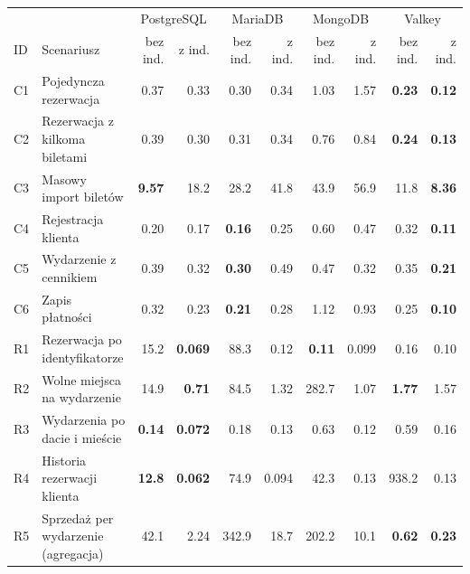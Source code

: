 \begin{tabular}{llrrrrrrrr}
\toprule
 & & \multicolumn{2}{c}{PostgreSQL} & \multicolumn{2}{c}{MariaDB} & \multicolumn{2}{c}{MongoDB} & \multicolumn{2}{c}{Valkey} \\
\cmidrule(lr){3-4}\cmidrule(lr){5-6}\cmidrule(lr){7-8}\cmidrule(lr){9-10}
ID & Scenariusz & bez ind. & z ind. & bez ind. & z ind. & bez ind. & z ind. & bez ind. & z ind. \\
\midrule
C1 & Pojedyncza rezerwacja & \num{0.37} & \num{0.33} & \num{0.30} & \num{0.34} & \num{1.03} & \num{1.57} & \textbf{\num{0.23}} & \textbf{\num{0.12}} \\
C2 & Rezerwacja z kilkoma biletami & \num{0.39} & \num{0.30} & \num{0.31} & \num{0.34} & \num{0.76} & \num{0.84} & \textbf{\num{0.24}} & \textbf{\num{0.13}} \\
C3 & Masowy import biletów & \textbf{\num{9.57}} & \num{18.2} & \num{28.2} & \num{41.8} & \num{43.9} & \num{56.9} & \num{11.8} & \textbf{\num{8.36}} \\
C4 & Rejestracja klienta & \num{0.20} & \num{0.17} & \textbf{\num{0.16}} & \num{0.25} & \num{0.60} & \num{0.47} & \num{0.32} & \textbf{\num{0.11}} \\
C5 & Wydarzenie z cennikiem & \num{0.39} & \num{0.32} & \textbf{\num{0.30}} & \num{0.49} & \num{0.47} & \num{0.32} & \num{0.35} & \textbf{\num{0.21}} \\
C6 & Zapis płatności & \num{0.32} & \num{0.23} & \textbf{\num{0.21}} & \num{0.28} & \num{1.12} & \num{0.93} & \num{0.25} & \textbf{\num{0.10}} \\
\midrule
R1 & Rezerwacja po identyfikatorze & \num{15.2} & \textbf{\num{0.069}} & \num{88.3} & \num{0.12} & \textbf{\num{0.11}} & \num{0.099} & \num{0.16} & \num{0.10} \\
R2 & Wolne miejsca na wydarzenie & \num{14.9} & \textbf{\num{0.71}} & \num{84.5} & \num{1.32} & \num{282.7} & \num{1.07} & \textbf{\num{1.77}} & \num{1.57} \\
R3 & Wydarzenia po dacie i mieście & \textbf{\num{0.14}} & \textbf{\num{0.072}} & \num{0.18} & \num{0.13} & \num{0.63} & \num{0.12} & \num{0.59} & \num{0.16} \\
R4 & Historia rezerwacji klienta & \textbf{\num{12.8}} & \textbf{\num{0.062}} & \num{74.9} & \num{0.094} & \num{42.3} & \num{0.13} & \num{938.2} & \num{0.13} \\
R5 & Sprzedaż per wydarzenie (agregacja) & \num{42.1} & \num{2.24} & \num{342.9} & \num{18.7} & \num{202.2} & \num{10.1} & \textbf{\num{0.62}} & \textbf{\num{0.23}} \\

\end{tabular}

